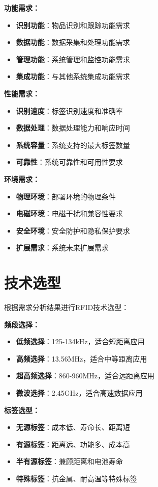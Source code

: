 \documentclass[12pt,UTF8]{ctexbook}
\begin{document}
\begin{itemize}[leftmargin=3.5em]
\begin{itemize}[leftmargin=3.5em]
\begin{itemize}[leftmargin=3.5em]
\begin{itemize}[leftmargin=3.5em]
\textbf{功能需求：}
\begin{itemize}[leftmargin=3.5em]
    \item \textbf{识别功能}：物品识别和跟踪功能需求
    \item \textbf{数据功能}：数据采集和处理功能需求
    \item \textbf{管理功能}：系统管理和监控功能需求
    \item \textbf{集成功能}：与其他系统集成功能需求
\end{itemize}

\textbf{性能需求：}
\begin{itemize}[leftmargin=3.5em]
    \item \textbf{识别速度}：标签识别速度和准确率
    \item \textbf{数据处理}：数据处理能力和响应时间
    \item \textbf{系统容量}：系统支持的最大标签数量
    \item \textbf{可靠性}：系统可靠性和可用性要求
\end{itemize}

\textbf{环境需求：}
\begin{itemize}[leftmargin=3.5em]
    \item \textbf{物理环境}：部署环境的物理条件
    \item \textbf{电磁环境}：电磁干扰和兼容性要求
    \item \textbf{安全环境}：安全防护和隐私保护要求
    \item \textbf{扩展需求}：系统未来扩展需求
\end{itemize}

\section{技术选型}

根据需求分析结果进行RFID技术选型：

\textbf{频段选择：}
\begin{itemize}[leftmargin=3.5em]
    \item \textbf{低频选择}：125-134kHz，适合短距离应用
    \item \textbf{高频选择}：13.56MHz，适合中等距离应用
    \item \textbf{超高频选择}：860-960MHz，适合远距离应用
    \item \textbf{微波选择}：2.45GHz，适合高速数据应用
\end{itemize}

\textbf{标签选型：}
\begin{itemize}[leftmargin=3.5em]
    \item \textbf{无源标签}：成本低、寿命长、距离短
    \item \textbf{有源标签}：距离远、功能多、成本高
    \item \textbf{半有源标签}：兼顾距离和电池寿命
    \item \textbf{特殊标签}：抗金属、耐高温等特殊标签
\end{itemize}


\end{itemize}
\end{itemize}
\end{itemize}
\end{itemize}
\end{document}
